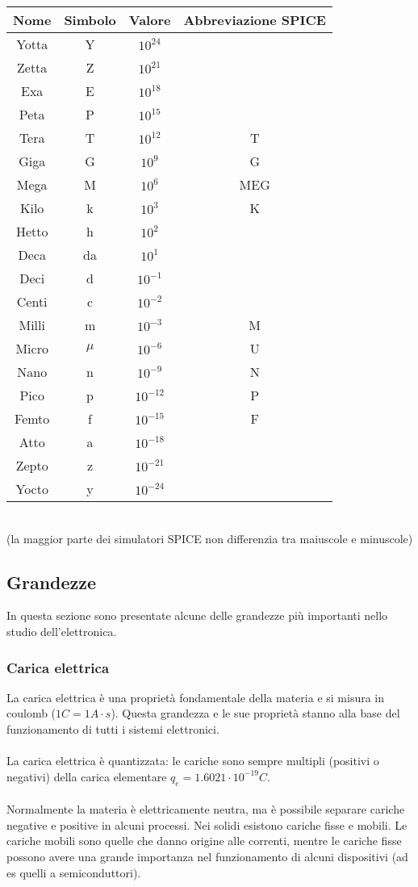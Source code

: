 \documentclass{article}
\begin{document}
\begin{center}
\begin{tabular}{|c|c|c|c|}
\hline
\textbf{Nome} & \textbf{Simbolo} & \textbf{Valore} & \textbf{Abbreviazione SPICE} \\
\hline
Yotta & Y & $10^{24}$ & \\
Zetta & Z & $10^{21}$ & \\
Exa & E & $10^{18}$ & \\
Peta & P & $10^{15}$ & \\
Tera & T & $10^{12}$ & T \\
Giga & G & $10^9$ & G \\
Mega & M & $10^6$ & MEG \\
Kilo & k & $10^3$ & K\\
Hetto & h & $10^2$ & \\
Deca & da & $10^1$ & \\
Deci & d & $10^{-1}$ & \\
Centi & c & $10^{-2}$ & \\
Milli & m & $10^{-3}$ & M \\
Micro & $\mu$ & $10^{-6}$ & U \\
Nano & n & $10^{-9}$ & N \\
Pico & p & $10^{-12}$ & P \\
Femto & f & $10^{-15}$ & F \\
Atto & a & $10^{-18}$ & \\
Zepto & z & $10^{-21}$ & \\
Yocto & y & $10^{-24}$ & \\
\hline
\end{tabular}
\\(la maggior parte dei simulatori SPICE non differenzia tra maiuscole e minuscole)
\end{center}

\subsection{Grandezze}
In questa sezione sono presentate alcune delle grandezze più importanti nello studio dell'elettronica.

\subsubsection{Carica elettrica}
La carica elettrica è una proprietà fondamentale della materia e si misura in coulomb ($1C=1A\cdot s$). Questa grandezza e le sue proprietà stanno alla base del funzionamento di tutti i sistemi elettronici.\\\\
La carica elettrica è quantizzata: le cariche sono sempre multipli (positivi o negativi) della carica elementare $q_e=1.6021\cdot 10^{-19}C$.\\\\
Normalmente la materia è elettricamente neutra, ma è possibile separare cariche negative e positive in alcuni processi. Nei solidi esistono cariche fisse e mobili. Le cariche mobili sono quelle che danno origine alle correnti, mentre le cariche fisse possono avere una grande importanza nel funzionamento di alcuni dispositivi (ad es quelli a semiconduttori).
\end{document}
